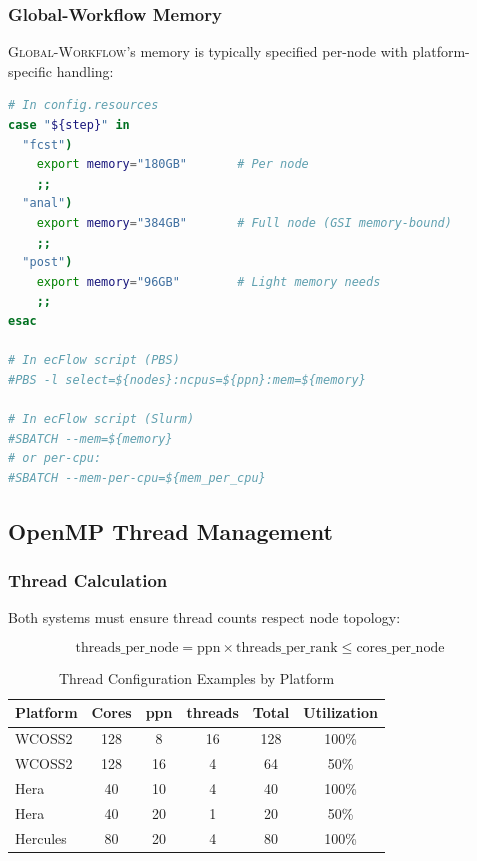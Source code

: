 \documentclass[11pt,twoside]{article}
\newcommand{\gw}{\textsc{Global-Workflow}}
\begin{document}
\subsubsection{Global-Workflow Memory}

\gw{}'s memory is typically specified per-node with platform-specific handling:

\begin{lstlisting}[language=Bash, caption={\gw{} Memory Handling}]
# In config.resources
case "${step}" in
  "fcst")
    export memory="180GB"       # Per node
    ;;
  "anal")
    export memory="384GB"       # Full node (GSI memory-bound)
    ;;
  "post")
    export memory="96GB"        # Light memory needs
    ;;
esac

# In ecFlow script (PBS)
#PBS -l select=${nodes}:ncpus=${ppn}:mem=${memory}

# In ecFlow script (Slurm)  
#SBATCH --mem=${memory}
# or per-cpu:
#SBATCH --mem-per-cpu=${mem_per_cpu}
\end{lstlisting}

\subsection{OpenMP Thread Management}

\subsubsection{Thread Calculation}

Both systems must ensure thread counts respect node topology:

\begin{equation}
\text{threads\_per\_node} = \text{ppn} \times \text{threads\_per\_rank} \leq \text{cores\_per\_node}
\end{equation}

\begin{table}[H]
\centering
\caption{Thread Configuration Examples by Platform}
\label{tab:thread-examples}
\begin{tabular}{@{}lccccc@{}}
\toprule
\textbf{Platform} & \textbf{Cores} & \textbf{ppn} & \textbf{threads} & \textbf{Total} & \textbf{Utilization} \\
\midrule
WCOSS2 & 128 & 8 & 16 & 128 & 100\% \\
WCOSS2 & 128 & 16 & 4 & 64 & 50\% \\
Hera & 40 & 10 & 4 & 40 & 100\% \\
Hera & 40 & 20 & 1 & 20 & 50\% \\
Hercules & 80 & 20 & 4 & 80 & 100\% \\
\bottomrule
\end{tabular}
\end{table}
\end{document}
